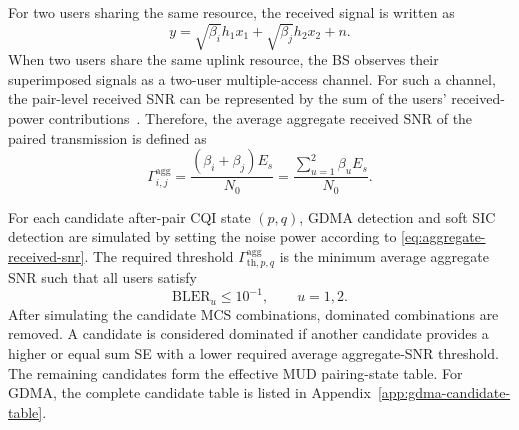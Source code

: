For two users sharing the same resource, the received signal is written as
\begin{equation}
    y
    =
    \sqrt{\beta_i}h_1x_1
    +
    \sqrt{\beta_j}h_2x_2
    +
    n.
    \label{eq:cqi-two-user-model}
\end{equation}
When two users share the same uplink resource, the BS observes their superimposed signals as a two-user multiple-access channel. For such a channel, the pair-level received SNR can be represented by the sum of 
the users' received-power contributions~\cite{sedaghat2018user}. 
Therefore, the average aggregate received SNR of the paired transmission is defined as
\begin{equation}
    \Gamma_{i,j}^{\mathrm{agg}}
    =
    \frac{(\beta_i+\beta_j)E_s}{N_0}
    =
    \frac{\sum_{u=1}^{2}\beta_u E_s}{N_0}.
    \label{eq:aggregate-received-snr}
\end{equation}

For each candidate after-pair CQI state $(p,q)$, GDMA detection and soft SIC detection are simulated by setting the noise power according to \eqref{eq:aggregate-received-snr}. The required threshold $\Gamma^{\mathrm{agg}}_{\mathrm{th},p,q}$ is the minimum average aggregate SNR such that all users satisfy
\begin{equation}
    \mathrm{BLER}_u \leq 10^{-1}, \qquad u=1,2.
\end{equation}
After simulating the candidate MCS combinations, dominated combinations are removed. A candidate is considered dominated if another candidate provides a higher or equal sum SE with a lower required average aggregate-SNR threshold. The remaining candidates form the effective MUD pairing-state table. For GDMA, the complete candidate table is listed in Appendix~\ref{app:gdma-candidate-table}.

